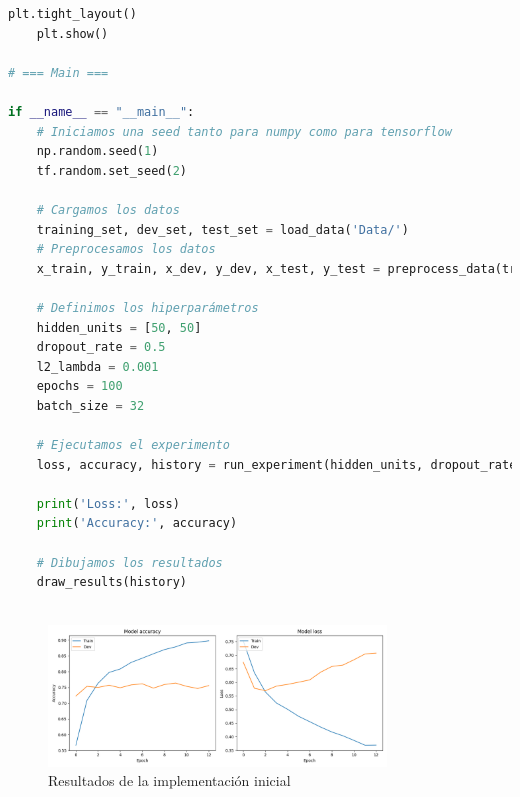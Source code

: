 \documentclass{report}
\begin{document}
\begin{lstlisting}[language=Python, caption=Implementación inicial del perceptron]
    plt.tight_layout()
    plt.show()

# === Main ===

if __name__ == "__main__":
    # Iniciamos una seed tanto para numpy como para tensorflow
    np.random.seed(1)
    tf.random.set_seed(2)
    
    # Cargamos los datos
    training_set, dev_set, test_set = load_data('Data/')
    # Preprocesamos los datos
    x_train, y_train, x_dev, y_dev, x_test, y_test = preprocess_data(training_set, dev_set, test_set)
    
    # Definimos los hiperparámetros
    hidden_units = [50, 50]
    dropout_rate = 0.5
    l2_lambda = 0.001
    epochs = 100
    batch_size = 32
    
    # Ejecutamos el experimento
    loss, accuracy, history = run_experiment(hidden_units, dropout_rate, l2_lambda, epochs, batch_size)
    
    print('Loss:', loss)
    print('Accuracy:', accuracy)
    
    # Dibujamos los resultados
    draw_results(history)
    
        \end{lstlisting}
        \begin{figure}[H]
          \centering
          \includegraphics[width=0.8\textwidth]{.img/perceptron1.png}
          \caption{Resultados de la implementación inicial}
        \end{figure}
        \clearpage
\end{document}
